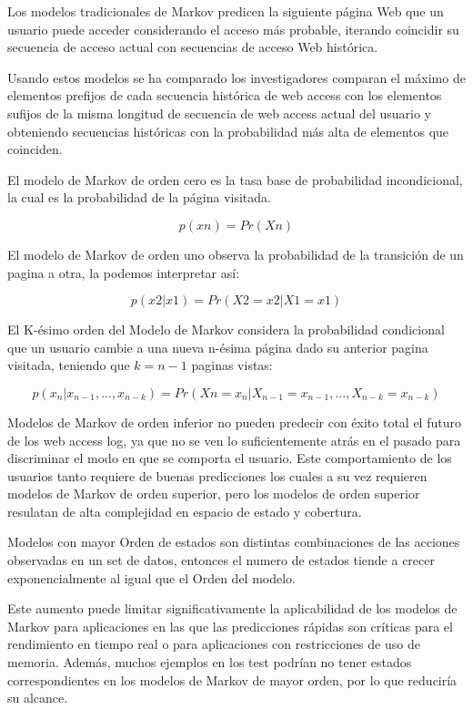  
 Los modelos tradicionales de Markov predicen la siguiente página Web que un usuario puede acceder considerando el acceso más probable, iterando coincidir su secuencia de acceso actual con secuencias de acceso Web histórica.
 

 
 Usando estos modelos se ha comparado los investigadores comparan el máximo de elementos  prefijos de cada secuencia histórica de web access con los elementos sufijos de la  misma longitud de secuencia de web access actual del usuario y obteniendo secuencias históricas con la probabilidad más alta de elementos que coinciden.
 
 El modelo de Markov de orden cero es la tasa base de probabilidad incondicional, la cual es la probabilidad de la página visitada.
 
$$ p(xn) = Pr(Xn) $$
 
 
 El modelo de Markov de orden uno observa la probabilidad de la transición de un pagina a otra, la podemos interpretar así:
 
 $$ p(x2 | x1) = Pr(X2 = x2 | X1 = x1) $$
 
 El K-ésimo orden del Modelo de Markov considera la probabilidad condicional que un usuario cambie a una nueva  n-ésima página  dado su anterior pagina visitada, teniendo que $k = n -1$ paginas vistas:
 
 

$$ p( x_{n} | x_{n-1},..., x_{n-k} ) = Pr(X{n} = x_{n} | X_{n-1} = x_{n-1},..., X_{n-k} = x_{n-k})$$
 
 
 
 Modelos de Markov de orden inferior no pueden predecir con éxito total el futuro de los web access log, ya que no se ven lo suficientemente atrás en el pasado para discriminar el modo en que se comporta el usuario. Este comportamiento de los usuarios tanto requiere de buenas predicciones los cuales a su vez requieren modelos de Markov de orden superior, pero los modelos de orden superior resulatan de alta complejidad en espacio de estado y cobertura.
 
Modelos con mayor Orden de estados son distintas combinaciones de las acciones observadas en un set de datos, entonces el numero de estados tiende a crecer exponencialmente al igual que el Orden del modelo.

Este aumento puede limitar significativamente la aplicabilidad de los modelos de Markov para aplicaciones en las que las predicciones rápidas son críticas para el rendimiento en tiempo real o para aplicaciones con restricciones de uso de memoria. Además, muchos ejemplos en los test podrían no tener estados correspondientes en los modelos de Markov de mayor orden, por lo que reduciría su alcance.
 
 

\nocite{*}
